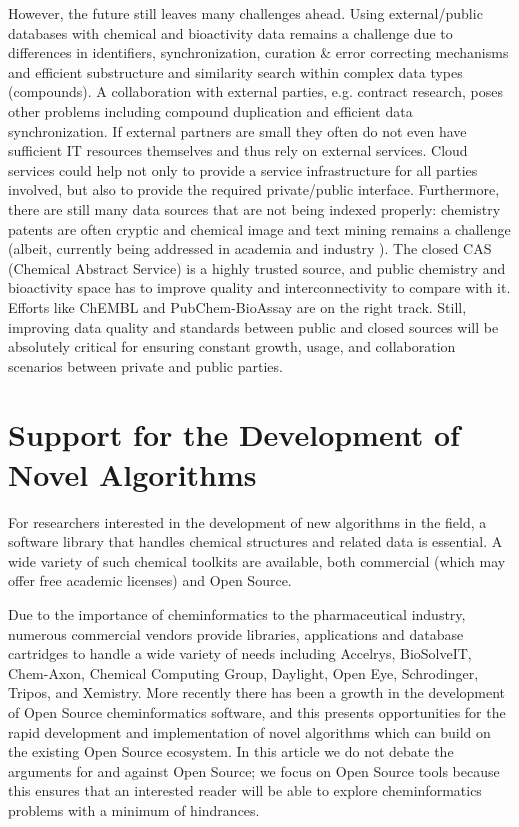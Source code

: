 \documentclass{sig-alternate}
\begin{document}
However, the future still leaves many challenges ahead. Using
external/public databases with chemical and bioactivity data remains a
challenge due to differences in identifiers, synchronization, curation
\& error correcting mechanisms and efficient substructure and
similarity search within complex data types (compounds). A
collaboration with external parties, e.g. contract research, poses
other problems including compound duplication and efficient data
synchronization. If external partners are small they often do not even
have sufficient IT resources themselves and thus rely on external
services. Cloud services could help not only to provide a service
infrastructure for all parties involved, but also to provide the
required private/public interface. Furthermore, there are still many
data sources that are not being indexed properly: chemistry patents
are often cryptic and chemical image and text mining remains a
challenge (albeit, currently being addressed in academia and industry
\cite{Jessop:2011fk,Sayle:2009uq}). The closed CAS (Chemical Abstract
Service) is a highly trusted source, and public chemistry and
bioactivity space has to improve quality and interconnectivity to
compare with it. Efforts like ChEMBL and PubChem-BioAssay are on the
right track. Still, improving data quality and standards between
public and closed sources will be absolutely critical for ensuring
constant growth, usage, and collaboration scenarios between private
and public parties.

\section{Support for the Development of Novel Algorithms}
\label{sec:development-support}

For researchers interested in the development of new algorithms in the
field, a software library that handles chemical structures and related
data is essential. A wide variety of such chemical toolkits are
available, both commercial (which may offer free academic
licenses) and Open Source.

Due to the importance of cheminformatics to the pharmaceutical
industry, numerous commercial vendors provide libraries,
applications and database cartridges to handle a wide variety of
needs including Accelrys, BioSolveIT, Chem-Axon, Chemical Computing Group,
Daylight, Open Eye, Schrodinger, Tripos, and Xemistry. More recently
there has been a growth in the development of Open
Source cheminformatics software, and this presents opportunities for
the rapid development and implementation of novel algorithms which can
build on the existing Open Source ecosystem. In this article we do not debate the
arguments for and against Open Source; we focus on Open Source
tools because this ensures that an interested reader will be able to explore
cheminformatics problems with a minimum of hindrances.
\end{document}
